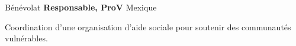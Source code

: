 \begin{rubric}{Bénévolat}
\noentry{~}
\entry*[08/2018 -- 07/2020]
\textbf{Responsable, ProV} \hfill Mexique\par
Coordination d'une organisation d'aide sociale pour soutenir des communautés vulnérables.
\hfill \href{https://www.facebook.com/groups/782118565323194}{\faFacebook}

\end{rubric}

